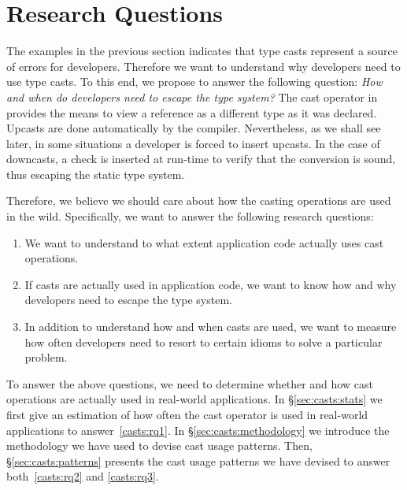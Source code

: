 \section{Research Questions}

The examples in the previous section indicates that type casts represent a source of errors for developers.
Therefore we want to understand why developers need to use type casts.
To this end, we propose to answer the following question:
\emph{How and when do developers need to escape the type system?}
The cast operator in \java{} provides the means to view a reference as a different type as it was declared.
Upcasts are done automatically by the compiler.
Nevertheless, as we shall see later, in some situations a developer is forced to insert upcasts.
In the case of downcasts, a check is inserted at run-time to verify that the conversion is sound, thus escaping the static type system.

Therefore, we believe we should care about how the casting operations are used in the wild.
Specifically, we want to answer the following research questions:

\begin{enumerate}[label=$RQ/C\arabic*:$,ref=$RQ/C\arabic*$,leftmargin=3.4\parindent]
\item\label{enum:rq1}{\bf \crqA}
We want to understand to what extent application code actually uses cast operations.
\item\label{enum:rq2}{\bf \crqB}
If casts are actually used in application code, we want to know how and why developers need to escape the type system.
\item\label{enum:rq3}{\bf \crqC}
In addition to understand how and when casts are used, we want to measure how often developers need to resort to certain idioms to solve a particular problem.
\end{enumerate}

To answer the above questions, we need to determine whether and how cast operations are actually used in real-world \java{} applications.
In \S\ref{sec:casts:stats} we first give an estimation of how often the cast operator is used in real-world applications to answer~\ref{casts:rq1}.
In \S\ref{sec:casts:methodology} we introduce the methodology we have used to devise cast usage patterns.
Then, \S\ref{sec:casts:patterns} presents the cast usage patterns we have devised to answer both~\ref{casts:rq2} and \ref{casts:rq3}.
